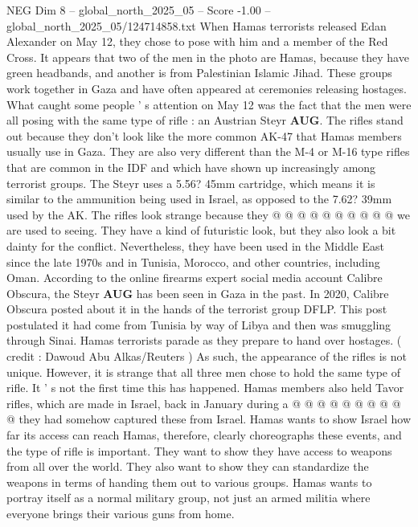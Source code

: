 \begin{textsample}{NEG Dim 8 – global\_north\_2025\_05 – Score -1.00 – global\_north\_2025\_05/124714858.txt}  \label{ex:f8_neg_412}
When Hamas terrorists released Edan Alexander on May 12, they chose to pose with him and a member of the Red Cross.
It appears that two of the men in the photo are Hamas, because they have green headbands, and another is from Palestinian Islamic Jihad.
These groups work together in Gaza and have often appeared at ceremonies releasing hostages.
What caught some people ' s attention on May 12 was the fact that the men were all posing with the same type of rifle : an Austrian Steyr \textbf{AUG}.
The rifles stand out because they don't look like the more common AK-47 that Hamas members usually use in Gaza.
They are also very different than the M-4 or M-16 type rifles that are common in the IDF and which have shown up increasingly among terrorist groups.
The Steyr uses a 5.56? 45mm cartridge, which means it is similar to the ammunition being used in Israel, as opposed to the 7.62? 39mm used by the AK.
The rifles look strange because they @ @ @ @ @ @ @ @ @ @ we are used to seeing.
They have a kind of futuristic look, but they also look a bit dainty for the conflict.
Nevertheless, they have been used in the Middle East since the late 1970s and in Tunisia, Morocco, and other countries, including Oman.
According to the online firearms expert social media account Calibre Obscura, the Steyr \textbf{AUG} has been seen in Gaza in the past.
In 2020, Calibre Obscura posted about it in the hands of the terrorist group DFLP.
This post postulated it had come from Tunisia by way of Libya and then was smuggling through Sinai.
Hamas terrorists parade as they prepare to hand over hostages. ( credit : Dawoud Abu Alkas/Reuters ) As such, the appearance of the rifles is not unique.
However, it is strange that all three men chose to hold the same type of rifle.
It ' s not the first time this has happened.
Hamas members also held Tavor rifles, which are made in Israel, back in January during a @ @ @ @ @ @ @ @ @ @ they had somehow captured these from Israel.
Hamas wants to show Israel how far its access can reach Hamas, therefore, clearly choreographs these events, and the type of rifle is important.
They want to show they have access to weapons from all over the world.
They also want to show they can standardize the weapons in terms of handing them out to various groups.
Hamas wants to portray itself as a normal military group, not just an armed militia where everyone brings their various guns from home.

\end{textsample}
